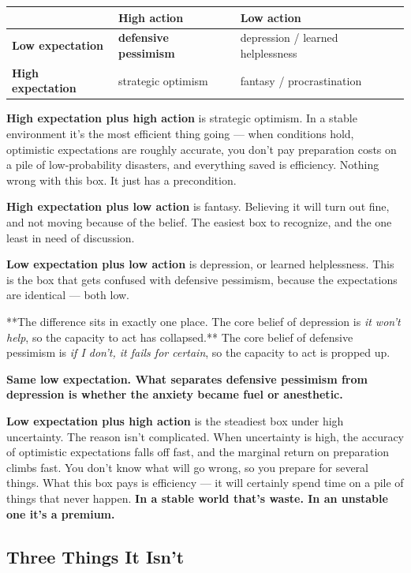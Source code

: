 \documentclass[11pt,a4paper]{article}
\begin{document}
\begin{center}

\begin{tabularx}{\textwidth}{lXX}
\toprule
 & High action & Low action \\
\midrule
\textbf{Low expectation} & \textbf{defensive pessimism} & depression / learned helplessness \\
\textbf{High expectation} & strategic optimism & fantasy / procrastination \\
\bottomrule
\end{tabularx}
\end{center}

\textbf{High expectation plus high action} is strategic optimism. In a stable environment it's the most efficient thing going --- when conditions hold, optimistic expectations are roughly accurate, you don't pay preparation costs on a pile of low-probability disasters, and everything saved is efficiency. Nothing wrong with this box. It just has a precondition.

\textbf{High expectation plus low action} is fantasy. Believing it will turn out fine, and not moving because of the belief. The easiest box to recognize, and the one least in need of discussion.

\textbf{Low expectation plus low action} is depression, or learned helplessness. This is the box that gets confused with defensive pessimism, because the expectations are identical --- both low.

**The difference sits in exactly one place. The core belief of depression is \textit{it won't help}, so the capacity to act has collapsed.** The core belief of defensive pessimism is \textit{if I don't, it fails for certain}, so the capacity to act is propped up.

\textbf{Same low expectation. What separates defensive pessimism from depression is whether the anxiety became fuel or anesthetic.}

\textbf{Low expectation plus high action} is the steadiest box under high uncertainty. The reason isn't complicated. When uncertainty is high, the accuracy of optimistic expectations falls off fast, and the marginal return on preparation climbs fast. You don't know what will go wrong, so you prepare for several things. What this box pays is efficiency --- it will certainly spend time on a pile of things that never happen. \textbf{In a stable world that's waste. In an unstable one it's a premium.}

\subsection{Three Things It Isn't}
\end{document}
